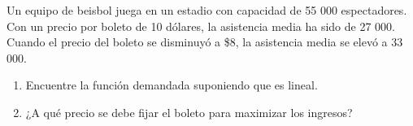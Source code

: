 \item Un equipo de beisbol juega en un estadio con capacidad de 55 000 espectadores. Con un precio por boleto de 10 dólares, la asistencia media ha sido de 27 000. Cuando el precio del boleto se disminuyó a \$8, la asistencia media se elevó a 33 000.
\begin{enumerate}
    \item[(a)] Encuentre la función demandada suponiendo que es lineal.
    \item[(b)] ¿A qué precio se debe fijar el boleto para maximizar los ingresos?
\end{enumerate}
